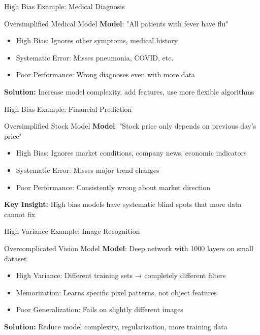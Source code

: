 \documentclass{beamer}
\begin{document}
\begin{frame}{High Bias Example: Medical Diagnosis}
\begin{examplebox}{Oversimplified Medical Model}
\textbf{Model}: "All patients with fever have flu"
\begin{itemize}
\item High Bias: Ignores other symptoms, medical history
\item Systematic Error: Misses pneumonia, COVID, etc.
\item Poor Performance: Wrong diagnoses even with more data
\end{itemize}
\end{examplebox}

\begin{keypointsbox}
\textbf{Solution:} Increase model complexity, add features, use more flexible algorithms
\end{keypointsbox}
\end{frame}

\begin{frame}{High Bias Example: Financial Prediction}
\begin{examplebox}{Oversimplified Stock Model}
\textbf{Model}: "Stock price only depends on previous day's price"
\begin{itemize}
\item High Bias: Ignores market conditions, company news, economic indicators
\item Systematic Error: Misses major trend changes
\item Poor Performance: Consistently wrong about market direction
\end{itemize}
\end{examplebox}

\begin{keypointsbox}
\textbf{Key Insight:} High bias models have systematic blind spots that more data cannot fix
\end{keypointsbox}
\end{frame}


\begin{frame}{High Variance Example: Image Recognition}
\begin{examplebox}{Overcomplicated Vision Model}
\textbf{Model}: Deep network with 1000 layers on small dataset
\begin{itemize}
\item High Variance: Different training sets → completely different filters
\item Memorization: Learns specific pixel patterns, not object features
\item Poor Generalization: Fails on slightly different images
\end{itemize}
\end{examplebox}

\begin{keypointsbox}
\textbf{Solution:} Reduce model complexity, regularization, more training data
\end{keypointsbox}
\end{frame}
\end{document}
